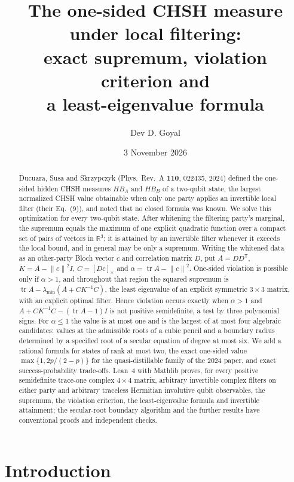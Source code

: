 \documentclass[11pt,a4paper]{article}
\title{The one-sided CHSH measure under local filtering:\\
exact supremum, violation criterion and\\ a least-eigenvalue formula}
\author{Dev D. Goyal}
\date{3 November 2026}
\theoremstyle{remark}\newtheorem{remark}[theorem]{Remark}
\DeclareMathOperator{\tr}{tr}\DeclareMathOperator{\spec}{spec}
\newcommand{\R}{\mathbb R}\newcommand{\C}{\mathbb C}
\newcommand{\norm}[1]{\left\lVert#1\right\rVert}
\begin{document}
\maketitle
\begin{abstract}
Ducuara, Susa and Skrzypczyk (Phys.\ Rev.\ A \textbf{110}, 022435, 2024)
defined the one-sided hidden CHSH measures $HB_A$ and $HB_B$ of a
two-qubit state, the largest normalized CHSH value obtainable when only one
party applies an invertible local filter (their Eq.~(9)), and noted that no
closed formula was known. We solve this optimization for every two-qubit
state. After whitening the filtering party's marginal, the supremum equals
the maximum of one explicit quadratic function over a compact set of pairs
of vectors in $\R^3$; it is attained by an invertible filter whenever it
exceeds the local bound, and in general may be only a supremum. Writing the
whitened data as an other-party Bloch vector $c$ and correlation matrix
$D$, put $A=DD^{\mathsf T}$, $K=A-\norm c^2 I$, $C=[Dc]_\times$ and
$\alpha=\tr A-\norm c^2$. One-sided violation is possible only if
$\alpha>1$, and throughout that region the squared supremum is
$\tr A-\lambda_{\min}(A+CK^{-1}C)$, the least eigenvalue of an explicit
symmetric $3\times3$ matrix, with an explicit optimal filter. Hence
violation occurs exactly when $\alpha>1$ and $A+CK^{-1}C-(\tr A-1)I$ is
not positive semidefinite, a test by three polynomial signs. For
$\alpha\le1$ the value is at most one and is the largest of at most four
algebraic candidates: values at the admissible roots of a cubic pencil and a
boundary radius determined by a specified root of a secular equation of degree
at most six. We add a
rational formula for states of rank at most two, the exact one-sided value
$\max\{1,2p/(2-p)\}$ for the quasi-distillable family of the 2024 paper,
and exact success-probability trade-offs. Lean~4 with Mathlib proves, for
every positive semidefinite trace-one complex $4\times4$ matrix, arbitrary
invertible complex filters on either party and arbitrary traceless
Hermitian involutive qubit observables, the supremum, the violation
criterion, the least-eigenvalue formula and invertible attainment; the
secular-root boundary algorithm and the further results have conventional
proofs and independent checks.
\end{abstract}

\setcounter{tocdepth}{1}
\tableofcontents

\section{Introduction}
\label{sec:intro}
\end{document}

